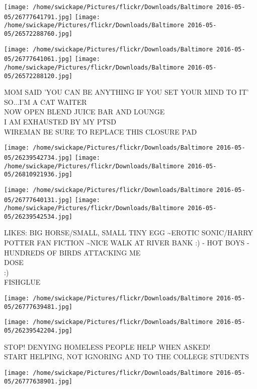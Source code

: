 \documentclass[10pt,letterpaper]{article}
\begin{document}
\texttt{[image: /home/swickape/Pictures/flickr/Downloads/Baltimore 2016-05-05/26777641791.jpg]}
\texttt{[image: /home/swickape/Pictures/flickr/Downloads/Baltimore 2016-05-05/26572288760.jpg]}

\texttt{[image: /home/swickape/Pictures/flickr/Downloads/Baltimore 2016-05-05/26777641061.jpg]}
\texttt{[image: /home/swickape/Pictures/flickr/Downloads/Baltimore 2016-05-05/26572288120.jpg]}

MOM SAID 'YOU CAN BE ANYTHING IF YOU SET YOUR MIND TO IT' SO...I'M A CAT WAITER\\
NOW OPEN BLEND JUICE BAR AND LOUNGE\\
I AM EXHAUSTED BY MY PTSD\\
WIREMAN BE SURE TO REPLACE THIS CLOSURE PAD\\
\pagebreak

\texttt{[image: /home/swickape/Pictures/flickr/Downloads/Baltimore 2016-05-05/26239542734.jpg]}
\texttt{[image: /home/swickape/Pictures/flickr/Downloads/Baltimore 2016-05-05/26810921936.jpg]}

\texttt{[image: /home/swickape/Pictures/flickr/Downloads/Baltimore 2016-05-05/26777640131.jpg]}
\texttt{[image: /home/swickape/Pictures/flickr/Downloads/Baltimore 2016-05-05/26239542534.jpg]}

LIKES: BIG HORSE/SMALL, SMALL TINY EGG \textasciitilde{}EROTIC SONIC/HARRY POTTER FAN FICTION \textasciitilde{}NICE WALK AT RIVER BANK :) {-} HOT BOYS {-} HUNDREDS OF BIRDS ATTACKING ME\\
DOSE\\
:)\\
FISHGLUE\\
\pagebreak

\texttt{[image: /home/swickape/Pictures/flickr/Downloads/Baltimore 2016-05-05/26777639481.jpg]}

\vspace{0.25in}
\texttt{[image: /home/swickape/Pictures/flickr/Downloads/Baltimore 2016-05-05/26239542204.jpg]}

STOP! DENYING HOMELESS PEOPLE HELP WHEN ASKED!\\
START HELPING, NOT IGNORING  AND TO THE COLLEGE STUDENTS\\
\pagebreak

\texttt{[image: /home/swickape/Pictures/flickr/Downloads/Baltimore 2016-05-05/26777638901.jpg]}
\end{document}
